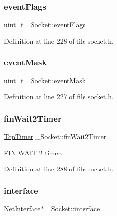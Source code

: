 \subsubsection{\texorpdfstring{event\+Flags}{eventFlags}}
{\footnotesize\ttfamily \hyperlink{compiler__port_8h_a12a1e9b3ce141648783a82445d02b58d}{uint\+\_\+t} \+\_\+\+Socket\+::event\+Flags}



Definition at line 228 of file socket.\+h.

\mbox{\label{struct__Socket_a81fc2ec7a7afdb0afd7bf1519ec5f89f}} 
\subsubsection{\texorpdfstring{event\+Mask}{eventMask}}
{\footnotesize\ttfamily \hyperlink{compiler__port_8h_a12a1e9b3ce141648783a82445d02b58d}{uint\+\_\+t} \+\_\+\+Socket\+::event\+Mask}



Definition at line 227 of file socket.\+h.

\mbox{\label{struct__Socket_ab612f7ddcc903a2872649ea0b7eddc3d}} 
\subsubsection{\texorpdfstring{fin\+Wait2\+Timer}{finWait2Timer}}
{\footnotesize\ttfamily \hyperlink{structTcpTimer}{Tcp\+Timer} \+\_\+\+Socket\+::fin\+Wait2\+Timer}



F\+I\+N-\/\+W\+A\+I\+T-\/2 timer. 



Definition at line 288 of file socket.\+h.

\mbox{\label{struct__Socket_a8dfa1ada309ed2bb86fe01ce1f3d47e8}} 
\subsubsection{\texorpdfstring{interface}{interface}}
{\footnotesize\ttfamily \hyperlink{net_8h_a2234db8911a1148c9159979d8f5e0d6b}{Net\+Interface}$\ast$ \+\_\+\+Socket\+::interface}



